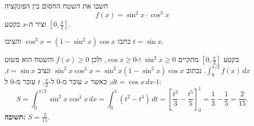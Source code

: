 
\begin{question}
חשבו את השטח החסום בין הפונקציה
\[ f(x) = \sin^2 x \cdot \cos^3 x \]
וציר ה-$x$ בקטע $[0, \frac{\pi}{2}]$.
\end{question}

\begin{hint}
כתבו $\cos^3 x = (1 - \sin^2 x)\cos x$ והציבו $t = \sin x$.
\end{hint}

\begin{solution}
בקטע $[0,\frac\pi2]$ מתקיים $\sin^2 x \ge 0$ ו-$\cos x\ge 0$, ולכן $f(x) \ge 0$ והשטח הוא פשוט $\int_0^{\pi/2} f(x)\,dx$.
נכתוב $\sin^2 x\cos^3 x = \sin^2 x(1 - \sin^2 x)\cos x$ ונציב $t = \sin x$, $dt = \cos x\,dx$; כאשר $x$ עובר מ-$0$ ל-$\frac\pi2$, $t$ עובר מ-$0$ ל-$1$:
\[ S = \int_0^{\pi/2}\sin^2 x\cos^3 x\,dx = \int_0^1 (t^2 - t^4)\,dt = \left[\frac{t^3}{3} - \frac{t^5}{5}\right]_0^1 = \frac13 - \frac15 = \frac{2}{15}. \]
\textbf{תשובה:} $S = \frac{2}{15}$.
\end{solution}
